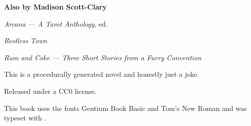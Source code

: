 
\thispagestyle{empty}
\null
\vfill
\begin{center}
    \textbf{Also by Madison Scott-Clary}

    \emph{Arcana --- A Tarot Anthology}, ed.

    \emph{Restless Town}

    \emph{Rum and Coke --- Three Short Stories from a Furry Convention}
\end{center}
\vfill
\singlespacing
{\small\parindent0pt\parskip5pt
\noindent This is a procedurally generated novel and honestly just a joke.

Released under a CC0 license.

This book uses the fonts Gentium Book Basic and {\TitleFont Tom's New Roman} and was typeset with {\XeLaTeX}.
}

\cleardoublepage
